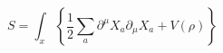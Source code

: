 


\[
  S = \int_x \left\{ \frac{1}{2} \sum_a \partial^\mu X_a \partial_\mu X_a + V(\rho) \right\}
\]
  

